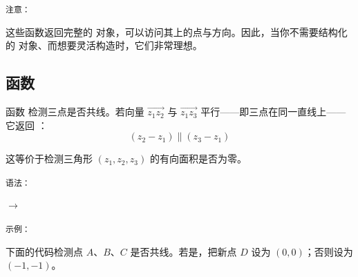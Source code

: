 \begin{center}
\end{center}

\medskip
\texttt{注意：}

这些函数返回完整的  对象，可以访问其上的点与方向。因此，当你不需要结构化的  对象、而想要灵活构造时，它们非常理想。

\subsection{函数 }
\label{sub:function_islinear}

函数  检测三点是否共线。若向量 $\overrightarrow{z_1z_2}$ 与 $\overrightarrow{z_1z_3}$ 平行——即三点在同一直线上——它返回 ：
\[
(z_2 - z_1) \parallel (z_3 - z_1)
\]

这等价于检测三角形 $(z_1, z_2, z_3)$ 的有向面积是否为零。

\medskip
\texttt{语法：}

\begin{center}
 $\rightarrow$ 
\end{center}

\texttt{示例：}

下面的代码检测点 $A$、$B$、$C$ 是否共线。若是，把新点 $D$ 设为 $(0,0)$；否则设为 $(-1,-1)$。

%

